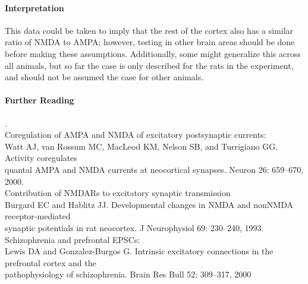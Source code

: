 \documentclass[11pt]{article}
\begin{document}
\paragraph{Interpretation}
This data could be taken to imply that the rest of the cortex also has a similar
ratio of NMDA to AMPA; however, testing in other brain areas should be done before
making these assumptions.  Additionally, some might generalize this across all animals,
but so far the case is only described for the rats in the experiment, and should
not be assumed the case for other animals.

\paragraph{Further Reading} \tiny{.}\\
\normalsize
Coregulation of AMPA and NMDA of excitatory postsynaptic currents: \\
\hspace*{0.5in} Watt AJ, van Rossum MC, MacLeod KM, Nelson SB, and Turrigiano GG. Activity coregulates \\
\hspace*{0.5in} quantal AMPA and NMDA currents at neocortical synapses. Neuron 26: 659–670, 2000. \\
Contribution of NMDARs to excitatory synaptic transmission  \\
\hspace*{0.5in} Burgard EC and Hablitz JJ. Developmental changes in NMDA and nonNMDA receptor-mediated \\
\hspace*{0.5in} synaptic potentials in rat neocortex. J Neurophysiol 69: 230–240, 1993. \\
Schizophrenia and prefrontal EPSCs: \\
\hspace*{0.5in} Lewis DA and Gonzalez-Burgos G. Intrinsic excitatory connections in the prefrontal cortex and the \\
\hspace*{0.5in} pathophysiology of schizophrenia. Brain Res Bull 52: 309–317, 2000
\end{document}
